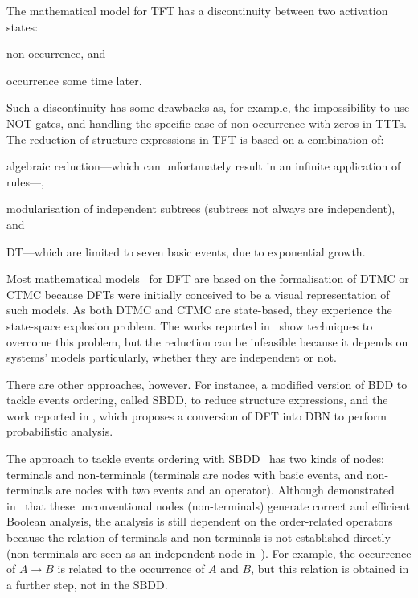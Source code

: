 \documentclass[12pt,openright,twoside,a4paper,oldfontcommands,english,brazil,final]{abntex2}
\theoremstyle{theo}
\begin{document}
The mathematical model for \ac{TFT} has a discontinuity between two activation states:
\begin{alineasinline}
  \item non-occurrence, and
  \item occurrence some time later.
\end{alineasinline}
Such a discontinuity has some drawbacks as, for example, the impossibility to use \ac{NOT} gates, and handling the specific case of non-occurrence with zeros in \acp{TTT}.
The reduction of structure expressions in \ac{TFT} is based on a combination of:
\begin{alineasinline}
  \item algebraic reduction---which can unfortunately result in an infinite application of rules---,
  \item modularisation of independent subtrees (subtrees not always are independent), and
  \item \ac{DT}---which are limited to seven basic events, due to exponential growth.
\end{alineasinline}


\begin{sloppypar}
Most mathematical models~\cite{LHT2013,CSD2000,BRM+2005} for \ac{DFT} are based on the formalisation of \ac{DTMC} or \ac{CTMC} because \acp{DFT} were initially conceived to be a visual representation of such models.
As both \ac{DTMC} and \ac{CTMC} are state-based, they experience the state-space explosion problem.
The works reported in~\cite{BKK+2003,BHH+2003,SAE1996b} show techniques to overcome this problem, but the reduction can be infeasible because it depends on systems' models particularly, whether they are independent or not.
\end{sloppypar}

There are other approaches, however.
For instance, a modified version of \ac{BDD} to tackle events ordering, called \acf{SBDD}, to reduce structure expressions, and the work reported in \cite{BRM+2005}, which proposes a conversion of \ac{DFT} into \ac{DBN} to perform probabilistic analysis.

The approach to tackle events ordering with \ac{SBDD}~\cite{XTD2012} has two kinds of nodes: terminals and non-terminals (terminals are nodes with basic events, and non-terminals are nodes with two events and an operator).
Although demonstrated in~\cite{Bryant1986} that these unconventional nodes (non-terminals) generate correct and efficient Boolean analysis, the analysis is still dependent on the order-related operators because the relation of terminals and non-terminals is not established directly (non-terminals are seen as an independent node in~\cite{XTD2012}).
For example, the occurrence of $A \rightarrow B$ is related to the occurrence of $A$ and $B$, but this relation is obtained in a further step, not in the \ac{SBDD}.
\end{document}
